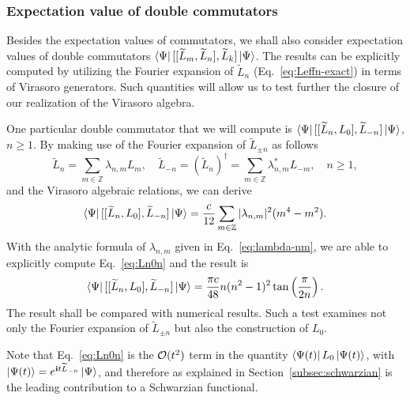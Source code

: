 \documentclass[12pt, nofootinbib]{article}
\theoremstyle{plain}
\theoremstyle{assumption}
\theoremstyle{definition}
\theoremstyle{plain}
\theoremstyle{plain}
\theoremstyle{plain}
\theoremstyle{plain}
\theoremstyle{plain}
\newcommand{\BS}[1]{{\color{BSorange}\footnotesize{(BS) #1}}}
\newcommand{\XL}[1]{{\color{XLgreen}\footnotesize{(XL) #1}}}
\def\Leff{\widetilde{L}}
\begin{document}
\subsubsection{Expectation value of double commutators}
\label{subsubsec:expt-double-comm}
Besides the expectation values of commutators, we shall also consider expectation values of double commutators $\bra{\Psi}[[\Leff_m,\Leff_n],\Leff_k]\ket{\Psi}$. The results can be explicitly computed by utilizing the Fourier expansion of $\Leff_n$ (Eq.~\eqref{eq:Leffn-exact}) in terms of Virasoro generators. 
Such quantities will allow us to test further the closure of our realization of the Virasoro algebra.

One particular double commutator that we will compute is $ \bra{\Psi}[[\Leff_{n},L_0],\Leff_{-n}]\ket{\Psi}$, $n\geq 1$. By making use of the Fourier expansion of $\Leff_{\pm n}$ as follows 
\begin{equation}
    \Leff_n = \sum_{m\in\mathbb{Z}} \lambda_{n,m} L_m,\quad \Leff_{-n} = (\Leff_n)^{\dagger} = \sum_{m\in\mathbb{Z}} \lambda_{n,m}^* L_{-m},\quad n\geq 1,
\end{equation}
and the Virasoro algebraic relations, we can derive %
\begin{equation}\label{eq:Ln0n}
    \bra{\Psi}[[\Leff_{n},L_0],\Leff_{-n}]\ket{\Psi} = \frac{c}{12}\sum_{m\in\mathbb{Z}} |\lambda_{n,m}|^2 (m^4-m^2).
\end{equation}
With the analytic formula of $\lambda_{n,m}$ given in Eq.~\eqref{eq:lambda-nm}, we are able to explicitly compute Eq.~\eqref{eq:Ln0n} and the result is
\begin{equation}\label{eq:Ln0n-analytic}
    \bra{\Psi}[[\Leff_{n},L_0],\Leff_{-n}]\ket{\Psi} = \frac{\pi c}{48} n (n^2-1)^2 \tan\left( \frac{\pi}{2n} \right). 
\end{equation}
The result shall be compared with numerical results. Such a test examines not only the Fourier expansion of $\Leff_{\pm n}$ but also the construction of $L_0$.  

Note that Eq.~\eqref{eq:Ln0n} is the ${\cal O}(t^2)$ term in the quantity 
$ \left\langle\Psi(t)\right| L_0 \left|\Psi(t)\right\rangle$, with $\ket{\Psi(t)} = e^{ \ii t \Leff_{-n}} \ket{\Psi} $, and therefore as explained in  
Section~\ref{subsec:schwarzian} is the leading contribution to a Schwarzian functional.
\end{document}
